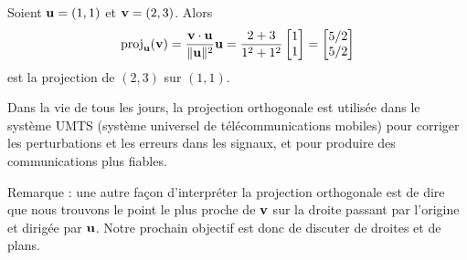 \begin{myexample} 
Soient $\mathbf{u} = (1,1)$ et $\mathbf{v} = (2,3)$.  Alors
$$
\operatorname{proj}_{\mathbf{u}}(\mathbf{v}) = \frac{\mathbf{v} \cdot \mathbf{u}}{\Vert \mathbf{u} \Vert^2} \mathbf{u}
= \frac{2+3}{1^2+1^2}\left[ \begin{matrix} 1\\1 \end{matrix} \right] = \left[ \begin{matrix} 5/2\\5/2 \end{matrix} \right]
$$
est la projection de $(2,3)$ sur $(1,1)$.
\end{myexample}

Dans la vie de tous les jours, la projection orthogonale est utilisée dans le système UMTS (système universel de télécommunications mobiles) pour corriger les perturbations et les erreurs dans les signaux, et pour produire des communications plus fiables.

Remarque : une autre façon d'interpr\'eter la projection orthogonale est de dire que
nous trouvons le point le plus proche de $\mathbf{v}$ sur la droite passant par l'origine et dirigée par $\mathbf{u}$.  
Notre prochain objectif est donc de discuter de droites et de plans.


